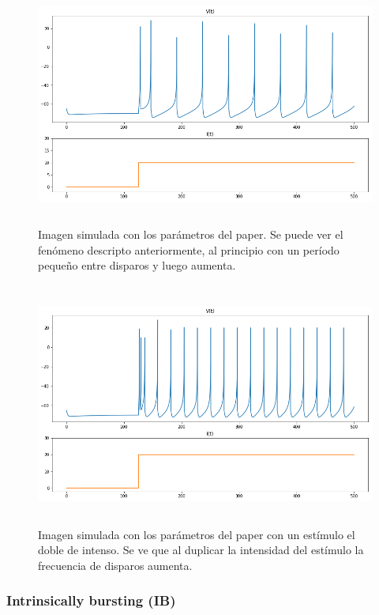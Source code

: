 \documentclass[12pt]{article}
\begin{document}
\begin{figure}[h]
    \centering
        \includegraphics[height=8cm]{images/RS_I10.png}
    \caption[fontsize=2pt]{Imagen simulada con los parámetros del paper. Se puede ver el fenómeno descripto anteriormente, al principio con un período pequeño entre disparos y luego aumenta.}
\end{figure}

\begin{figure}[h!]
    \centering
        \includegraphics[height=8cm]{images/RS_I20.png}
    \caption[fontsize=2pt]{Imagen simulada con los parámetros del paper con un estímulo el doble de intenso. Se ve que al duplicar la intensidad del estímulo la frecuencia de disparos aumenta.}
\end{figure}
 \newpage

\subsubsection{Intrinsically bursting (IB)}
\end{document}
